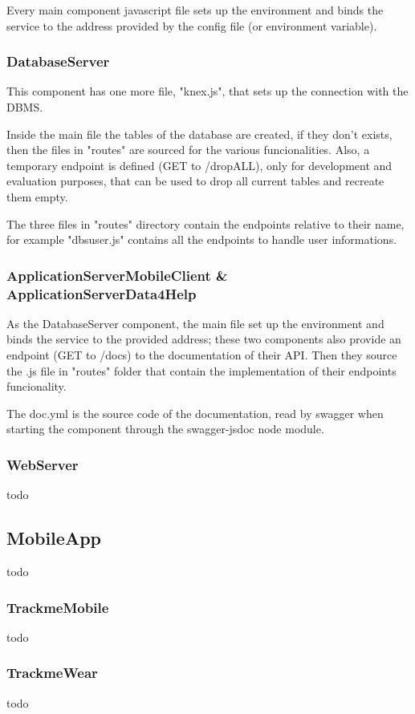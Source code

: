 \documentclass[../main.tex]{subfiles}
\begin{document}
Every main component javascript file sets up the environment and binds the service to the address provided by the config file (or environment variable).

\subsubsection{DatabaseServer}

This component has one more file, "knex.js", that sets up the connection with the DBMS.

Inside the main file the tables of the database are created, if they don't exists, then the files in "routes" are sourced for the various funcionalities. Also, a temporary endpoint is defined (GET to /dropALL), only for development and evaluation purposes, that can be used to drop all current tables and recreate them empty.

The three files in "routes" directory contain the endpoints relative to their name, for example "dbs\textunderscore user.js" contains all the endpoints to handle user informations.

\subsubsection{ApplicationServerMobileClient \& ApplicationServerData4Help}

As the DatabaseServer component, the main file set up the environment and binds the service to the provided address; these two components also provide an endpoint (GET to /docs) to the documentation of their API. Then they source the .js file in "routes" folder that contain the implementation of their endpoints funcionality.

The doc.yml is the source code of the documentation, read by swagger when starting the component through the swagger-jsdoc node module.

\subsubsection{WebServer}

todo

\subsection{MobileApp}

todo

\subsubsection{TrackmeMobile}

todo

\subsubsection{TrackmeWear}

todo
\end{document}
